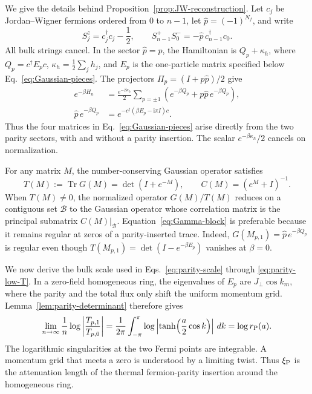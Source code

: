 \documentclass[aps,prb,preprint,nofootinbib,longbibliography]{revtex4-2}
\newcommand{\Tr}{\operatorname{Tr}}
\newcommand{\ii}{\mathrm{i}}
\begin{document}
We give the details behind Proposition~\ref{prop:JW-reconstruction}.  Let
$c_j$ be Jordan--Wigner fermions ordered from $0$ to $n-1$, let
$\widehat p=(-1)^{N_f}$, and write
\begin{equation}
 S_j^z=c_j^\dagger c_j-\frac12,
 \qquad
 S_{n-1}^+S_0^-=-\widehat p\,c_{n-1}^\dagger c_0.
 \label{eq:JW-boundary}
\end{equation}
All bulk strings cancel.  In the sector $\widehat p=p$, the Hamiltonian is
$Q_p+\kappa_h$, where $Q_p=c^\dagger E_pc$,
$\kappa_h=\frac12\sum_jh_j$, and $E_p$ is the one-particle matrix specified below
Eq.~\eqref{eq:Gaussian-pieces}.  The projectors
$\Pi_p=(I+p\widehat p)/2$ give
\begin{align}
 e^{-\beta H_n}
 &=\frac{e^{-\beta\kappa_h}}2\sum_{p=\pm1}
 \left(e^{-\beta Q_p}+p\widehat p\,e^{-\beta Q_p}\right),
 \label{eq:parity-projectors}\\
 \widehat p\,e^{-\beta Q_p}
 &=e^{-c^\dagger(\beta E_p-\ii\pi I)c}.
 \label{eq:parity-insertion}
\end{align}
Thus the four matrices in Eq.~\eqref{eq:Gaussian-pieces} arise directly from
the two parity sectors, with and without a parity insertion.  The scalar
$e^{-\beta\kappa_h}/2$ cancels on normalization.

For any matrix $M$, the number-conserving Gaussian operator satisfies
\begin{equation}
 T(M):=\Tr G(M)=\det(I+e^{-M}),
 \qquad C(M)=(e^M+I)^{-1}.
 \label{eq:Gaussian-trace}
\end{equation}
When $T(M)\ne0$, the normalized operator $G(M)/T(M)$ reduces on a contiguous
set $\mathcal B$ to the Gaussian operator whose correlation matrix is the
principal submatrix $C(M)|_{\mathcal B}$.  Equation~\eqref{eq:Gamma-block}
is preferable because it remains regular at zeros of a parity-inserted
trace.  Indeed, $G(M_{p,1})=\widehat p\,e^{-\beta Q_p}$ is regular even
though $T(M_{p,1})=\det(I-e^{-\beta E_p})$ vanishes at $\beta=0$.

We now derive the bulk scale used in
Eqs.~\eqref{eq:parity-scale} through \eqref{eq:parity-low-T}.  In a zero-field
homogeneous ring, the eigenvalues of $E_p$ are
$J_\perp\cos k_m$, where the parity and the total flux only shift the
uniform momentum grid.  Lemma~\ref{lem:parity-determinant} therefore gives
\begin{equation}
 \lim_{n\to\infty}\frac1n
 \log\left|\frac{T_{p,1}}{T_{p,0}}\right|
 =\frac1{2\pi}\int_{-\pi}^{\pi}
 \log\left|\tanh\!\left(\frac a2\cos k\right)\right|\,dk
 =\log r_{\rm P}(a).
 \label{eq:parity-bulk-limit}
\end{equation}
The logarithmic singularities at the two Fermi points are integrable.  A
momentum grid that meets a zero is understood by a limiting twist.  Thus
$\xi_{\rm P}$ is the attenuation length of the thermal fermion-parity
insertion around the homogeneous ring.
\end{document}
